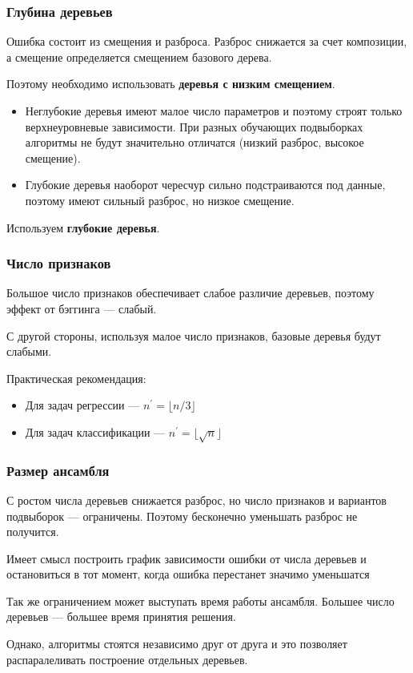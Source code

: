 \documentclass{beamer}
\begin{document}
	\begin{frame}
		\frametitle{Глубина деревьев}

		Ошибка состоит из смещения и разброса.
		Разброс снижается за счет композиции, а смещение определяется смещением базового дерева.

		Поэтому необходимо использовать \textbf{деревья с низким смещением}.
		\begin{itemize}
			\item Неглубокие деревья имеют малое число параметров и поэтому строят только верхнеуровневые зависимости.
			При разных обучающих подвыборках алгоритмы не будут значительно отличатся (низкий разброс, высокое смещение).
			\item Глубокие деревья наоборот чересчур сильно подстраиваются под данные, поэтому имеют сильный разброс, но низкое смещение.
		\end{itemize}
		\vspace{15pt}

		Используем \textbf{глубокие деревья}.
	\end{frame}

	\begin{frame}
		\frametitle{Число признаков}

		Большое число признаков обеспечивает слабое различие деревьев, поэтому эффект
		от бэггинга --- слабый.

		С другой стороны, используя малое число признаков, базовые деревья будут слабыми.

		\vspace{15pt}

		Практическая рекомендация:
		\begin{itemize}
			\item Для задач регрессии --- $n^{'} = \lfloor n / 3 \rfloor$
			\item Для задач классификации --- $n^{'} = \lfloor \sqrt{n} \rfloor$
		\end{itemize}
	\end{frame}

	\begin{frame}
		\frametitle{Размер ансамбля}

		С ростом числа деревьев снижается разброс, но число признаков и вариантов подвыборок --- ограничены.
		Поэтому бесконечно уменьшать разброс не получится.

		\vspace{15pt}

		Имеет смысл построить график зависимости ошибки от числа деревьев и остановиться в тот момент, когда
		ошибка перестанет значимо уменьшатся

		\vspace{15pt}

		Так же ограничением может выступать время работы ансамбля. Большее число деревьев --- большее время принятия решения.

		Однако, алгоритмы стоятся независимо друг от друга и это позволяет распаралеливать построение отдельных деревьев.
	\end{frame}
\end{document}

